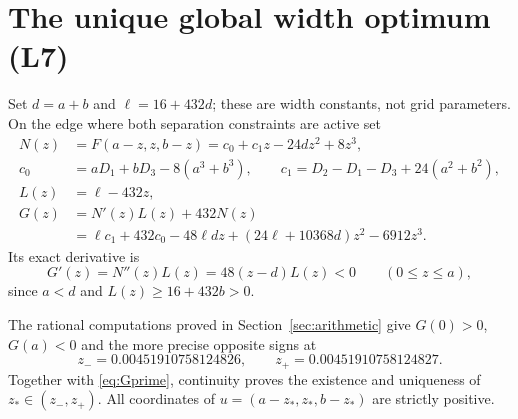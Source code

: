 \documentclass[11pt,a4paper]{article}
\theoremstyle{remark}\newtheorem{remark}[theorem]{Remark}
\begin{document}
\section{The unique global width optimum (L7)}\label{sec:width}
Set $d=a+b$ and $\ell=16+432d$; these are width constants, not grid
parameters. On the edge where both separation constraints are active set
\begin{align}
N(z)&=F(a-z,z,b-z)=c_0+c_1z-24dz^2+8z^3,\nonumber\\
c_0&=aD_1+bD_3-8(a^3+b^3),\qquad
c_1=D_2-D_1-D_3+24(a^2+b^2),\nonumber\\
L(z)&=\ell-432z,\nonumber\\
G(z)&=N'(z)L(z)+432N(z)\label{eq:G}\\
&=\ell c_1+432c_0-48\ell dz+(24\ell+10368d)z^2-6912z^3.\nonumber
\end{align}
Its exact derivative is
\begin{equation}\label{eq:Gprime}
G'(z)=N''(z)L(z)=48(z-d)L(z)<0\qquad(0\le z\le a),
\end{equation}
since $a<d$ and $L(z)\ge16+432b>0$.

The rational computations proved in Section~\ref{sec:arithmetic} give
$G(0)>0$, $G(a)<0$ and the more precise opposite signs at
\begin{equation}\label{eq:zbracket}
z_-=0.00451910758124826,\qquad z_+=0.00451910758124827.
\end{equation}
Together with \eqref{eq:Gprime}, continuity proves the existence and
uniqueness of $z_*\in(z_-,z_+)$. All coordinates of
$u=(a-z_*,z_*,b-z_*)$ are strictly positive.
\end{document}
